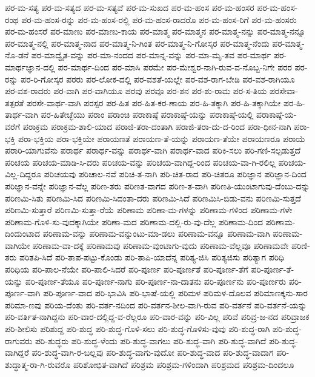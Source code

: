 {ಪರ-ಮ-ಸತ್ಯ
ಪರ-ಮ-ಸತ್ಯದ
ಪರ-ಮ-ಸತ್ಯವೆ
ಪರ-ಮ-ಸುಖದ
ಪರ-ಮ-ಹಂಸ
ಪರ-ಮ-ಹಂಸರ
ಪರ-ಮ-ಹಂಸ-ರಂಥ
ಪರ-ಮ-ಹಂಸ-ರನ್ನು
ಪರ-ಮ-ಹಂಸ-ರಲ್ಲಿ
ಪರ-ಮ-ಹಂಸ-ರಾದರೊ
ಪರ-ಮ-ಹಂಸ-ರಿಗೆ
ಪರ-ಮ-ಹಂಸರು
ಪರ-ಮ-ಹಂಸರೆ
ಪರ-ಮಾಣು
ಪರ-ಮಾಣು-ಕಾಯ
ಪರ-ಮಾತ್ಮ
ಪರ-ಮಾತ್ಮನ
ಪರ-ಮಾತ್ಮ-ನನ್ನು
ಪರ-ಮಾತ್ಮ-ನನ್ನೂ
ಪರ-ಮಾತ್ಮ-ನಲ್ಲಿ
ಪರ-ಮಾತ್ಮ-ನಾದ
ಪರ-ಮಾತ್ಮ-ನಿ-ಗಿಂತ
ಪರ-ಮಾತ್ಮ-ನಿ-ಗೋಸ್ಕರ
ಪರ-ಮಾತ್ಮ-ನೆಂದು
ಪರ-ಮಾತ್ಮ-ನೊ-ಡನೆ
ಪರ-ಮಾದ್ವೈತ-ವನ್ನು
ಪರ-ಮಾ-ನಂದದ
ಪರ-ಮಾನ್ನ-ವನ್ನು
ಪರ-ಮಾ-ಮೃ-ತವ
ಪರ-ಮಾರ್ಥ
ಪರ-ಮಾರ್ಥಜ್ಞಾನ-ದಲ್ಲಿ
ಪರ-ಮಾರ್ಥ-ದಿಂದ
ಪರ-ಮಾಸಿ
ಪರಮೇ
ಪರ-ಮೇಶ್ವರ-ನಾಗಿ-ರುವ-ವ-ನೊಬ್ಬ-ನಿಗೇ
ಪರರ
ಪರ-ರನ್ನು
ಪರ-ರಿ-ಗೋಸ್ಕರ
ಪರರು
ಪರ-ಲೋಕ-ದಲ್ಲಿ
ಪರ-ವಶತೆ-ಯಲ್ಲೇ
ಪರ-ವಶ-ರಾಗ-ಬೇಡಿ
ಪರ-ವಶ-ರಾಗಿಯೂ
ಪರ-ವಶ-ರಾದರು
ಪರ-ವಾಗಿ
ಪರ-ವಾಗಿಯೂ
ಪರವು
ಪರವೂ
ಪರ-ಶನ
ಪರ-ಶು-ರಾಮ
ಪರ-ಸ-ತಿಯ
ಪರಸೇವಾ-ತತ್ಪರತೆ
ಪರಸೇ-ವಾರ್ಥ-ವಾಗಿ
ಪರಸ್ಪರ
ಪರ-ಹಿತ
ಪರ-ಹಿತ-ಕರ-ಣಾಯ
ಪರ-ಹಿ-ತಕ್ಕಾಗಿ
ಪರ-ಹಿ-ತಕ್ಕಾಗಿಯೇ
ಪರ-ಹಿ-ತಾರ್ಥ-ವಾಗಿ
ಪರ-ಹಿತೇಚ್ಛೆಯು
ಪರಾಂ
ಪರಾಂಚಿ
ಪರಾಕಾಷ್ಠೆ
ಪರಾಕಾಷ್ಠೆ-ಯನ್ನು
ಪರಾಕಾಷ್ಠೆ-ಯಲ್ಲಿ
ಪರಾಕಾಷ್ಠೆ-ಯ-ವರೆಗೆ
ಪರಾಕ್ರಮ
ಪರಾಕ್ರಮ-ಶಾಲಿ-ಯಾದ
ಪರಾಜಿ-ತರಾ-ದಂತಾಗಿ
ಪರಾಜಿ-ತರಾ-ದು-ದ-ರಿಂದ
ಪರಾ-ಧೀನ-ನಾಗಿ
ಪರಾ-ಭಕ್ತಿ
ಪರಾ-ಭಕ್ತಿಯ
ಪರಾ-ಭಕ್ತಿಯೇ
ಪರಾಯಣತೆ
ಪರಾಯಣ-ತೆ-ಯನ್ನು
ಪರಾಯಣ-ತೆಯೇ
ಪರಾಯಣರೂ
ಪರಾಯೆ
ಪರಾರಿ-ಯಾಗುವೆನು
ಪರಾರ್ಥ
ಪರಾರ್ಥ-ವನ್ನು
ಪರಾರ್ಥ-ವಾಗಿ
ಪರಾರ್ಥ-ವಾದ
ಪರಿಕಿ-ಸಲು
ಪರಿ-ಗಣಿ-ಸಲ್ಪಡುತ್ತದೆ
ಪರಿಚಯ
ಪರಿಚಯ-ಮಾಡಿ-ಸಿ-ದರು
ಪರಿಚಯ-ವನ್ನು
ಪರಿಚಯ-ವಾಗಿದ್ದ-ರಿಂದ
ಪರಿಚಯ-ವಾ-ಗಿ-ರಲಿಲ್ಲ
ಪರಿಚಯ-ವಿಲ್ಲ-ದಿದ್ದರೂ
ಪರಿಚಯವು
ಪರಿಚಾಲ-ನವೆ
ಪರಿಚಿ-ತ-ನಾಗಿ
ಪರಿ-ಚಿತ-ರಾದ
ಪರಿ-ಚಿತರೂ
ಪರಿಜ್ಞಾನ
ಪರಿಜ್ಞಾನ-ದಿಂದ
ಪರಿಜ್ಞಾನ-ವನ್ನೇ
ಪರಿಜ್ಞಾನ-ವೆಲ್ಲ
ಪರಿಣ-ತರು
ಪರಿಣತ-ವಾಗದ
ಪರಿಣ-ತ-ವಾಗಿ
ಪರಿಣತಿ-ಯುಂಟಾಗುವು-ದೆಂಬು-ದನ್ನು
ಪರಿಣಮಿ-ಸಿತು
ಪರಿಣಮಿ-ಸಿದ
ಪರಿಣಮಿ-ಸಿದಂತಾ-ದರು
ಪರಿಣಮಿ-ಸಿದೆ
ಪರಿಣಮಿಸಿ-ಬಿಡು-ವನು
ಪರಿಣಮಿ-ಸುತ್ತದೆ
ಪರಿಣಮಿ-ಸುತ್ತಾರೆ
ಪರಿಣಮಿ-ಸುತ್ತಾ-ರೆಯೆ
ಪರಿಣಾಮ
ಪರಿಣಾ-ಮ-ಗಳನ್ನು
ಪರಿಣಾಮ-ಗಳಿಂದ
ಪರಿಣಾಮ-ಗಳೇ
ಪರಿಣಾಮ-ಗೊಳಿ-ಸು-ವುದಕ್ಕಾಗಿಯೇ
ಪರಿಣಾ-ಮದ
ಪರಿಣಾಮ-ದಲ್ಲಿ-ರು-ವು-ದೆಲ್ಲ
ಪರಿಣಾಮ-ದಿಂದ
ಪರಿಣಾಮ-ದಿಂದುಂಟಾದ
ಪರಿಣಾಮ-ವನ್ನು
ಪರಿಣಾಮ-ವನ್ನುಂಟು-ಮಾ-ಡಲು
ಪರಿಣಾಮ-ವನ್ನೂ
ಪರಿಣಾಮ-ವಾಗಿ
ಪರಿಣಾಮ-ವಾಗಿಯೇ
ಪರಿಣಾಮ-ವಾ-ದಕ್ಕೆ
ಪರಿಣಾಮವು
ಪರಿಣಾಮ-ವುಂಟಾಗು-ವುದು
ಪರಿಣಾಮ-ವೆಲ್ಲವೂ
ಪರಿಣಾಮವೇ
ಪರಿಣಿ-ತರು
ಪರಿತಪಿ-ಸಿದೆ
ಪರಿ-ತಾಪ-ಪಟ್ಟು-ಕೊಂಡು
ಪರಿ-ತಾಪಿ-ಯಾದೆನ್ನ
ಪರಿತ್ಯ-ಜಿಸಿ
ಪರಿತ್ಯಜಿಸು
ಪರಿತ್ಯಾಗ
ಪರಿಧಿ
ಪರಿಧಿಯ
ಪರಿ-ಪಾಲ-ನೆಯೇ
ಪರಿ-ಪಾಲಿ-ಸಿದರೆ
ಪರಿ-ಪೂರ್ಣ
ಪರಿ-ಪೂರ್ಣತೆ
ಪರಿ-ಪೂರ್ಣ-ತೆಗೆ
ಪರಿ-ಪೂರ್ಣ-ತೆ-ಯನ್ನು
ಪರಿ-ಪೂರ್ಣ-ತೆಯೂ
ಪರಿ-ಪೂರ್ಣ-ನಾಗು
ಪರಿ-ಪೂರ್ಣ-ನಾ-ದಾತನು
ಪರಿ-ಪೂರ್ಣನು
ಪರಿ-ಪೂರ್ಣರು
ಪರಿ-ಪೂರ್ಣ-ವಾಗಿ
ಪರಿ-ಪೂರ್ಣ-ವಾದ
ಪರಿ-ಭಾವಿಸಿ
ಪರಿ-ಭಾಷೆ-ಯಲ್ಲಿ
ಪರಿಮಳ
ಪರಿಮಳ-ದೊಲವ
ಪರಿಮಾಣಕ್ಕನು-ಸಾರ
ಪರಿಮಾ-ಣವು
ಪರಿಯ-ದೆಂತು
ಪರಿ-ವರ್ತ-ನದಿಂದ
ಪರಿ-ವರ್ತನ-ಶೀಲ-ವಾಗಿ-ರುವ
ಪರಿ-ವರ್ತನೆ
ಪರಿ-ವರ್ತನೆ-ಯನ್ನು
ಪರಿ-ವರ್ತಿತ-ನಾಗಿದ್ದನು
ಪರಿ-ವಾರ-ದಲ್ಲಿದ್ದ-ವ-ರೆಲ್ಲರೂ
ಪರಿ-ವಾರ-ವನ್ನು
ಪರಿ-ವಿಲ್ಲ
ಪರಿವೆ
ಪರಿವ್ರ-ಜ-ನದ
ಪರಿವ್ರಾಜಕ
ಪರಿ-ಶೀಲಿಸು
ಪರಿಶುದ್ದ
ಪರಿ-ಶುದ್ಧ
ಪರಿ-ಶುದ್ಧ-ಗೊಳಿ-ಸಲು
ಪರಿ-ಶುದ್ಧ-ಗೊಳಿಸು-ವುವು
ಪರಿ-ಶುದ್ಧ-ರಾಗಿ
ಪರಿ-ಶುದ್ಧ-ರಾಗುವರು
ಪರಿ-ಶುದ್ಧರು
ಪರಿ-ಶುದ್ಧ-ಳೆಂದು
ಪರಿ-ಶುದ್ಧ-ವಾಗಲು
ಪರಿ-ಶುದ್ಧ-ವಾಗಿ
ಪರಿ-ಶುದ್ಧ-ವಾಗಿದೆ
ಪರಿ-ಶುದ್ಧ-ವಾಗಿದ್ದರೆ
ಪರಿ-ಶುದ್ಧ-ವಾಗಿ-ರ-ಬಲ್ಲವು
ಪರಿ-ಶುದ್ಧ-ವಾಗು-ವುದೋ
ಪರಿ-ಶುದ್ಧ-ವಾದ
ಪರಿ-ಶುದ್ಧ-ವಾದಾಗ
ಪರಿ-ಶುದ್ಧಾತ್ಮ-ರಾ-ಗಿ-ರುವರೊ
ಪರಿಶೋಭಿತ-ವಾಗಿದೆ
ಪರಿಶ್ರಮ
ಪರಿಶ್ರಮ-ಗಳಿಂದಾಗಿ
ಪರಿಶ್ರಮದ
ಪರಿಶ್ರಮ-ದಿಂದಲೂ
}
